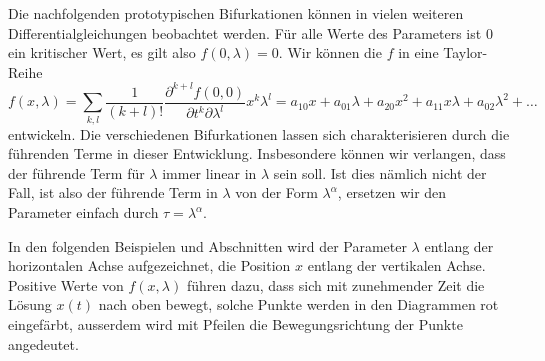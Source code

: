 Die nachfolgenden prototypischen Bifurkationen können in vielen
%
weiteren Differentialgleichungen beobachtet werden. 
Für alle Werte des Parameters ist $0$ ein kritischer Wert,
es gilt also $f(0,\lambda)=0$.
Wir können die $f$ in eine Taylor-Reihe 
\begin{equation}
f(x,\lambda)
=
\sum_{k,l} \frac{1}{(k+l)!}\frac{\partial^{k+l} f(0,0)}{\partial t^k\partial\lambda^l} x^k\lambda^l
=
a_{10}x + a_{01}\lambda
+
a_{20}x^2 + a_{11}x\lambda + a_{02}\lambda^2 + \dots
\end{equation}
entwickeln.
Die verschiedenen Bifurkationen lassen sich charakterisieren durch
die führenden Terme in dieser Entwicklung.
Insbesondere können wir verlangen, dass der führende Term für $\lambda$
immer linear in $\lambda$ sein soll.
Ist dies nämlich nicht der Fall, ist also der führende Term in 
$\lambda$ von der Form $\lambda^\alpha$, ersetzen wir den
Parameter einfach durch $\tau=\lambda^\alpha$.

In den folgenden Beispielen und Abschnitten wird der Parameter $\lambda$
entlang der horizontalen Achse aufgezeichnet, die Position $x$
entlang der vertikalen Achse.
Positive Werte von $f(x,\lambda)$ führen dazu, dass sich mit zunehmender
Zeit die Lösung $x(t)$ nach oben bewegt, solche Punkte werden in den
Diagrammen rot eingefärbt, ausserdem wird mit Pfeilen die Bewegungsrichtung
der Punkte angedeutet.

